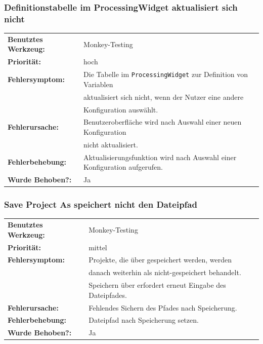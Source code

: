\documentclass{article}
\newcommand{\classref}[1]{\texttt{#1}}
\newcommand{\guibutton}[1]{\fbox{\texttt{#1}}}
\begin{document}
\subsubsection*{Definitionstabelle im ProcessingWidget aktualisiert sich nicht}
\begin{tabular}{ll}
    \textbf{Benutztes Werkzeug:} & Monkey-Testing\\
    \textbf{Priorität:} & hoch\\
    \textbf{Fehlersymptom:} & Die Tabelle im \classref{ProcessingWidget} zur Definition von Variablen\\
    & aktualisiert sich nicht, wenn der Nutzer eine andere \\
    &Konfiguration auswählt.\\
    \textbf{Fehlerursache:} & Benutzeroberfläche wird nach Auswahl einer neuen Konfiguration\\
    & nicht aktualisiert.\\
    \textbf{Fehlerbehebung:} & Aktualisierungsfunktion wird nach Auswahl einer Konfiguration aufgerufen.\\
    \textbf{Wurde Behoben?:} & Ja\\
\end{tabular}

\subsubsection*{Save Project As speichert nicht den Dateipfad}
\begin{tabular}{ll}
    \textbf{Benutztes Werkzeug:} & Monkey-Testing\\
    \textbf{Priorität:} & mittel\\
    \textbf{Fehlersymptom:} & Projekte, die über \guibutton{Save Project As} gespeichert werden, werden\\
    & danach weiterhin als nicht-gespeichert behandelt.\\
    & Speichern über \guibutton{Save} erfordert erneut Eingabe des Dateipfades.\\
    \textbf{Fehlerursache:} & Fehlendes Sichern des Pfades nach Speicherung.\\
    \textbf{Fehlerbehebung:} & Dateipfad nach Speicherung setzen.\\
    \textbf{Wurde Behoben?:} & Ja\\
\end{tabular}
\end{document}
